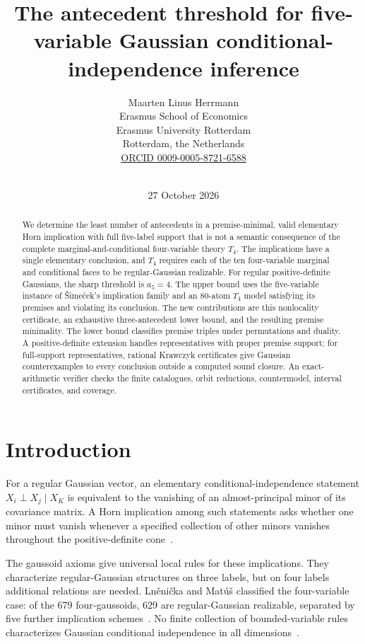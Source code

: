 \documentclass[10pt]{article}
\title{The antecedent threshold for five-variable Gaussian conditional-independence inference}
\author{Maarten Linus Herrmann\\
\small Erasmus School of Economics\\
\small Erasmus University Rotterdam\\
\small Rotterdam, the Netherlands\\
\small\href{https://orcid.org/0009-0005-8721-6588}{ORCID 0009-0005-8721-6588}}
\date{\statusline\\27 October 2026}
\theoremstyle{definition}
\begin{document}
\maketitle
\vspace{-1.25em}

\begin{abstract}
We determine the least number of antecedents in a premise-minimal, valid elementary Horn implication with full five-label support that is not a semantic consequence of the complete marginal-and-conditional four-variable theory $T_4$.  The implications have a single elementary conclusion, and $T_4$ requires each of the ten four-variable marginal and conditional faces to be regular-Gaussian realizable.  For regular positive-definite Gaussians, the sharp threshold is $a_5=4$.  The upper bound uses the five-variable instance of \v{S}ime\v{c}ek's implication family and an 80-atom $T_4$ model satisfying its premises and violating its conclusion.  The new contributions are this nonlocality certificate, an exhaustive three-antecedent lower bound, and the resulting premise minimality.  The lower bound classifies premise triples under permutations and duality.  A positive-definite extension handles representatives with proper premise support; for full-support representatives, rational Krawczyk certificates give Gaussian counterexamples to every conclusion outside a computed sound closure.  An exact-arithmetic verifier checks the finite catalogues, orbit reductions, countermodel, interval certificates, and coverage.
\end{abstract}

\section{Introduction}

For a regular Gaussian vector, an elementary conditional-independence statement $X_i\perp X_j\mid X_K$ is equivalent to the vanishing of an almost-principal minor of its covariance matrix.  A Horn implication among such statements asks whether one minor must vanish whenever a specified collection of other minors vanishes throughout the positive-definite cone~\cite{Matus2005}.

The gaussoid axioms give universal local rules for these implications.  They characterize regular-Gaussian structures on three labels, but on four labels additional relations are needed.  Ln\v{e}ni\v{c}ka and Mat\'u\v{s} classified the four-variable case: of the 679 four-gaussoids, 629 are regular-Gaussian realizable, separated by five further implication schemes~\cite{LM2007}.  No finite collection of bounded-variable rules characterizes Gaussian conditional independence in all dimensions~\cite{Simecek2006,Sullivant2009}.
\end{document}
